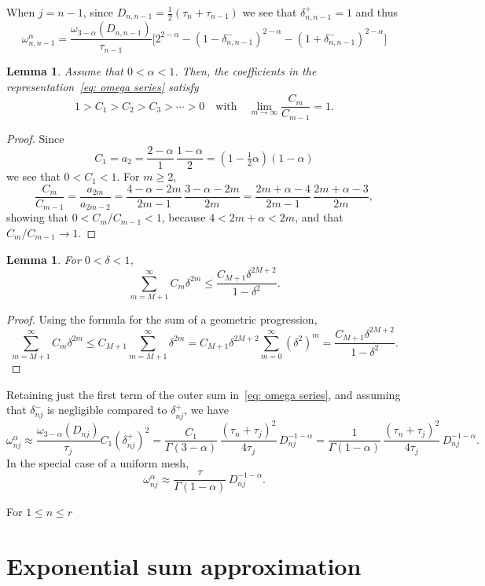 \documentclass[a4paper,12pt]{article}
\newtheorem{lemma}[theorem]{Lemma}
\begin{document}
When $j=n-1$, since $D_{n,n-1}=\tfrac12(\tau_n+\tau_{n-1})$ we see that
$\delta_{n,n-1}^+=1$ and thus
\[
\omega^\alpha_{n,n-1}=\frac{\omega_{3-\alpha}(D_{n,n-1})}{\tau_{n-1}}
\bigl[
    2^{2-\alpha}-(1-\delta_{n,n-1}^-)^{2-\alpha}
    -(1+\delta_{n,n-1}^-)^{2-\alpha}\bigr]
\]

\begin{lemma}
Assume that $0<\alpha<1$. Then, the coefficients in the
representation~\eqref{eq: omega series} satisfy
\[
1>C_1>C_2>C_3>\cdots>0\quad\text{with}\quad
\lim_{m\to\infty}\frac{C_m}{C_{m-1}}=1.
\]
\end{lemma}
\begin{proof}
Since
\[
C_1=a_2=\frac{2-\alpha}{1}\,\frac{1-\alpha}{2}=(1-\tfrac12\alpha)(1-\alpha)
\]
we see that $0<C_1<1$.  For $m\ge2$,
\[
\frac{C_m}{C_{m-1}}=\frac{a_{2m}}{a_{2m-2}}
    =\frac{4-\alpha-2m}{2m-1}\,\frac{3-\alpha-2m}{2m}
    =\frac{2m+\alpha-4}{2m-1}\,\frac{2m+\alpha-3}{2m},
\]
showing that $0<C_m/C_{m-1}<1$, because $4<2m+\alpha<2m$, and that
$C_m/C_{m-1}\to1$.
\end{proof}

\begin{lemma}
For $0<\delta<1$,
\[
\sum_{m=M+1}^\infty C_m\delta^{2m}\le \frac{C_{M+1}\delta^{2M+2}}{1-\delta^2}.
\]
\end{lemma}
\begin{proof}
Using the formula for the sum of a geometric progression,
\[
\sum_{m=M+1}^\infty C_m\delta^{2m}\le C_{M+1}\sum_{m=M+1}^\infty\delta^{2m}
    =C_{M+1}\delta^{2M+2}\sum_{m=0}^\infty(\delta^2)^m
    =\frac{C_{M+1}\delta^{2M+2}}{1-\delta^2}.
\]
\end{proof}

Retaining just the first term of the outer sum in~\eqref{eq: omega series}, and
assuming that $\delta^-_{nj}$ is negligible compared to $\delta^+_{nj}$, we have
\[
\omega^\alpha_{nj}\approx
\frac{\omega_{3-\alpha}(D_{nj})}{\tau_j}C_1(\delta^+_{nj})^2
    =\frac{C_1}{\Gamma(3-\alpha)}\,
    \frac{(\tau_n+\tau_j)^2}{4\tau_j}\,D_{nj}^{-1-\alpha}
    =\frac{1}{\Gamma(1-\alpha)}\,
    \frac{(\tau_n+\tau_j)^2}{4\tau_j}\,D_{nj}^{-1-\alpha}.
\]
In the special case of a uniform mesh,
\[
\omega^\alpha_{nj}\approx\frac{\tau}{\Gamma(1-\alpha)}\,D_{nj}^{-1-\alpha}.
\]

For $1\le n\le r$
\section{Exponential sum approximation}
\end{document}
